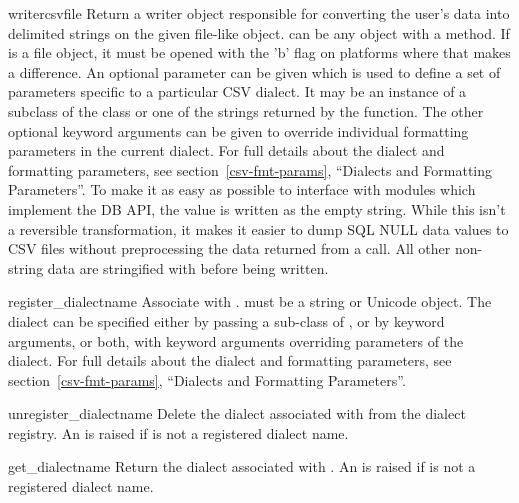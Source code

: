 \begin{funcdesc}{writer}{csvfile}
Return a writer object responsible for converting the user's data into
delimited strings on the given file-like object.   can be any
object with a  method.  If  is a file object,
it must be opened with the 'b' flag on platforms where that makes a
difference.  An optional
{} parameter can be given which is used to define a set of
parameters specific to a particular CSV dialect.  It may be an instance
of a subclass of the  class or one of the strings
returned by the  function.  The other optional
{} keyword arguments can be given to override individual
formatting parameters in the current dialect.  For full details
about the dialect and formatting parameters, see
section~\ref{csv-fmt-params}, ``Dialects and Formatting Parameters''.
To make it as easy as possible to
interface with modules which implement the DB API, the value
 is written as the empty string.  While this isn't a
reversible transformation, it makes it easier to dump SQL NULL data values
to CSV files without preprocessing the data returned from a
 call.  All other non-string data are stringified
with  before being written.
\end{funcdesc}

\begin{funcdesc}{register_dialect}{name}
Associate  with .   must be a string
or Unicode object. The dialect can be specified either by passing a
sub-class of , or by  keyword arguments,
or both, with keyword arguments overriding parameters of the dialect.
For full details about the dialect and formatting parameters, see
section~\ref{csv-fmt-params}, ``Dialects and Formatting Parameters''.
\end{funcdesc}

\begin{funcdesc}{unregister_dialect}{name}
Delete the dialect associated with  from the dialect registry.  An
 is raised if  is not a registered dialect
name.
\end{funcdesc}

\begin{funcdesc}{get_dialect}{name}
Return the dialect associated with .  An  is
raised if  is not a registered dialect name.

\end{funcdesc}

